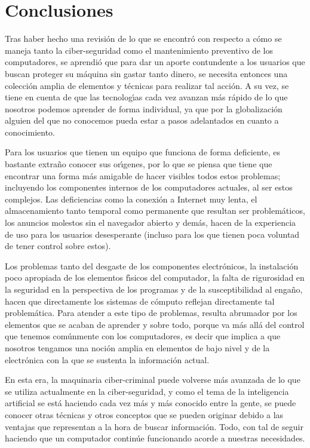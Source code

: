 \pagebreak
\section{Conclusiones}

Tras haber hecho una revisi\'on de lo que se encontr\'o con respecto a c\'omo se
maneja tanto la ciber-seguridad como el mantenimiento preventivo de los
computadores, se aprendi\'o que para dar un aporte contundente a los usuarios que
buscan proteger su m\'aquina sin gastar tanto dinero, se necesita entonces una
colecci\'on amplia de elementos y t\'ecnicas para realizar tal acci\'on. A su vez,
se tiene en cuenta de que las tecnolog\'{\i}as cada vez avanzan m\'as r\'apido de lo que
nosotros podemos aprender de forma individual, ya que por la globalizaci\'on
alguien del que no conocemos pueda estar a pasos adelantados en cuanto a
conocimiento.

Para los usuarios que tienen un equipo que funciona de forma deficiente, es
bastante extra\~no conocer sus or\'{\i}genes, por lo que se piensa que tiene que
encontrar una forma m\'as amigable de hacer visibles todos estos problemas;
incluyendo los componentes internos de los computadores actuales, al ser estos
complejos. Las deficiencias como la conexi\'on a Internet muy lenta, el
almacenamiento tanto temporal como permanente que resultan ser problem\'aticos,
los anuncios molestos sin el navegador abierto y dem\'as, hacen de la
experiencia de uso para los usuarios desesperante (incluso para los que tienen
poca voluntad de tener control sobre estos).

Los problemas tanto del desgaste de los componentes electr\'onicos, la instalaci\'on
poco apropiada de los elementos f\'{\i}sicos del computador, la falta de rigurosidad
en la seguridad en la perspectiva de los programas y de la susceptibilidad al
enga\~no, hacen que directamente los sistemas de c\'omputo reflejan directamente tal
problem\'atica. Para atender a este tipo de problemas, resulta abrumador por los
elementos que se acaban de aprender y sobre todo, porque va m\'as all\'a del control
que tenemos com\'unmente con los computadores, es decir que implica a que nosotros
tengamos una noci\'on amplia en elementos de bajo nivel y de la electr\'onica con la
que se sustenta la informaci\'on actual.

En esta era, la maquinaria ciber-criminal puede volverse m\'as avanzada de lo que
se utiliza actualmente en la ciber-seguridad, y como el tema de la inteligencia
artificial se est\'a haciendo cada vez m\'as y m\'as conocido entre la gente, se puede
conocer otras t\'ecnicas y otros conceptos que se pueden originar debido a las
ventajas que representan a la hora de buscar informaci\'on. Todo, con tal de 
seguir haciendo que un computador contin\'ue funcionando acorde a nuestras
necesidades.
